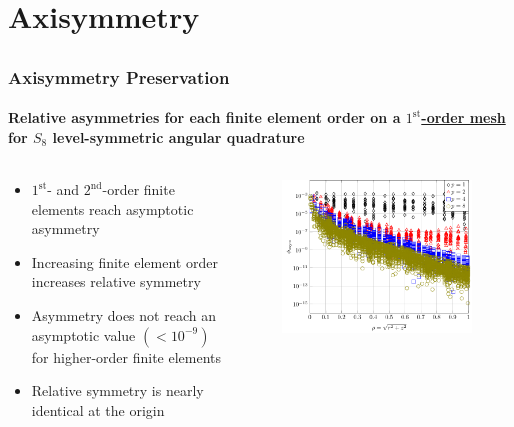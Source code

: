 \documentclass[compress,t]{beamer}
\begin{document}
\section{Axisymmetry}
\subsection{}

\begin{frame}[t]
\frametitle{Axisymmetry Preservation}
\framesubtitle{Relative asymmetries for each finite element order on a \underline{$1^\text{st}$-order mesh} for $S_8$ level-symmetric angular quadrature}

\begin{columns}[T]

\begin{column}{0.4\textwidth}
\begin{itemize}
\item{$1^\text{st}$- and $2^\text{nd}$-order finite elements reach asymptotic asymmetry}
\item{Increasing finite element order increases relative symmetry}
\item{Asymmetry does not reach an asymptotic value $(<10^{-9})$ for higher-order finite elements}
\item{Relative symmetry is nearly identical at the origin}
\end{itemize}

\end{column}

\begin{column}{0.6\textwidth}
\begin{figure}
\flushright
\includegraphics[scale=0.6]{./graphics/RZASMMSLinearRhoBrunnerS8g1r2.pdf}
\end{figure}

\end{column}

\end{columns}

\end{frame}
\end{document}
